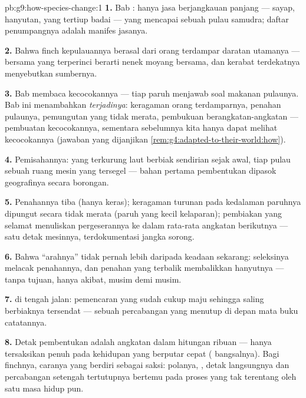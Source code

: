 \begin{solution}{pb:g9:how-species-change:1}
\textbf{1.} Bab : hanya jasa berjangkauan
panjang --- sayap, hanyutan, yang tertiup badai --- yang
mencapai sebuah pulau samudra; daftar penumpangnya adalah
manifes jasanya.

\textbf{2.} Bahwa  finch kepulauannya berasal dari
orang terdampar daratan utamanya ---  bersama yang
terperinci berarti nenek moyang bersama, dan kerabat
terdekatnya menyebutkan  sumbernya.

\textbf{3.} Bab  membaca kecocokannya --- tiap
paruh menjawab soal makanan pulaunya. Bab ini menambahkan
\emph{terjadinya}: keragaman orang terdamparnya, penahan
pulaunya, pemungutan yang tidak merata, pembukuan
berangkatan-angkatan --- pembuatan kecocokannya, sementara
sebelumnya kita hanya dapat melihat kecocokannya (jawaban
yang dijanjikan \cref{rem:g4:adapted-to-their-world:how}).

\textbf{4.} Pemisahannya:  yang terkurung laut
berbiak sendirian sejak awal, tiap pulau sebuah ruang mesin
yang tersegel --- bahan pertama pembentukan 
dipasok geografinya secara borongan.

\textbf{5.} Penahannya tiba (hanya  keras); keragaman
turunan pada kedalaman paruhnya dipungut secara tidak merata
(paruh yang kecil kelaparan); pembiakan yang selamat
menuliskan pergeserannya ke dalam rata-rata angkatan
berikutnya --- satu detak mesinnya, terdokumentasi jangka
sorong.

\textbf{6.} Bahwa ``arahnya'' tidak pernah lebih daripada
keadaan sekarang: seleksinya melacak penahannya, dan penahan
yang terbalik membalikkan hanyutnya --- tanpa tujuan, hanya
akibat, musim demi musim.

\textbf{7.}  di
tengah jalan: pemencaran yang sudah cukup maju sehingga
saling berbiaknya tersendat --- sebuah percabangan yang
menutup di depan mata buku catatannya.

\textbf{8.} Detak pembentukan  adalah angkatan
dalam hitungan ribuan --- hanya tersaksikan penuh pada
kehidupan yang berputar cepat ( bangsalnya). Bagi
 finchnya, caranya yang berdiri sebagai saksi:
polanya, , detak langsungnya dan percabangan
setengah tertutupnya bertemu pada proses yang tak terentang
oleh satu masa hidup pun.


\end{solution}

